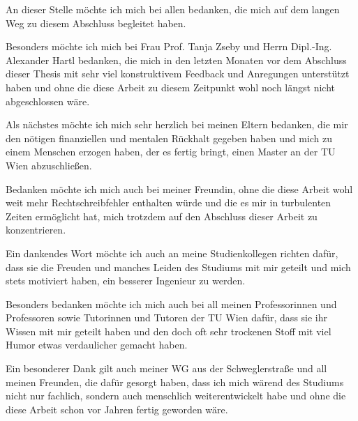 \documentclass[draft,final]{vutinfth} %
\theoremstyle{break}
\begin{document}
\frontmatter %

\addstatementpage

\begin{danksagung*}
An dieser Stelle möchte ich mich bei allen bedanken, die mich auf dem langen Weg zu diesem Abschluss begleitet haben. 

Besonders möchte ich mich bei Frau Prof. Tanja Zseby und Herrn Dipl.-Ing. Alexander Hartl bedanken, die mich in den letzten Monaten vor dem Abschluss dieser Thesis mit sehr viel konstruktivem Feedback und Anregungen unterstützt haben und ohne die diese Arbeit zu diesem Zeitpunkt wohl noch längst nicht abgeschlossen wäre.

Als nächstes möchte ich mich sehr herzlich bei meinen Eltern bedanken, die mir den nötigen finanziellen und mentalen Rückhalt gegeben haben und mich zu einem Menschen erzogen haben, der es fertig bringt, einen Master an der TU Wien abzuschließen.

Bedanken möchte ich mich auch bei meiner Freundin, ohne die diese Arbeit wohl weit mehr Rechtschreibfehler enthalten würde und die es mir in turbulenten Zeiten ermöglicht hat, mich trotzdem auf den Abschluss dieser Arbeit zu konzentrieren.

Ein dankendes Wort möchte ich auch an meine Studienkollegen richten dafür, dass sie die Freuden und manches Leiden des Studiums mit mir geteilt und mich stets motiviert haben, ein besserer Ingenieur zu werden.

Besonders bedanken möchte ich mich auch bei all meinen Professorinnen und Professoren sowie Tutorinnen und Tutoren der TU Wien dafür, dass sie ihr Wissen mit mir geteilt haben und den doch oft sehr trockenen Stoff mit viel Humor etwas verdaulicher gemacht haben.

Ein besonderer Dank gilt auch meiner WG aus der Schweglerstraße und all meinen Freunden, die dafür gesorgt haben, dass ich mich wärend des Studiums nicht nur fachlich, sondern auch menschlich weiterentwickelt habe und ohne die diese Arbeit schon vor Jahren fertig geworden wäre.




\end{danksagung*}
\end{document}
